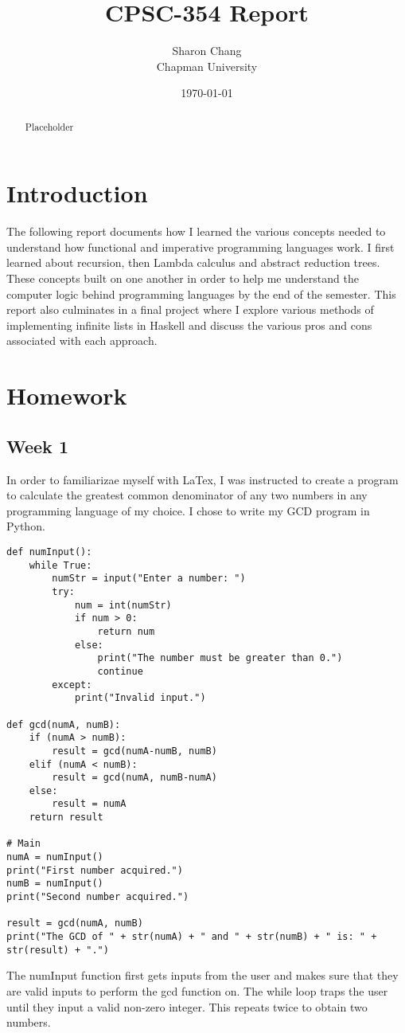 \documentclass{article}
\title{CPSC-354 Report}
\author{Sharon Chang  \\ Chapman University}
\date{\today}
\theoremstyle{theorem}
\theoremstyle{definition}
\theoremstyle{remark}
\begin{document}
\maketitle

\begin{abstract}
Placeholder  
\end{abstract}

\tableofcontents

\section{Introduction}\label{intro}

The following report documents how I learned the various concepts needed to understand how functional and imperative programming languages work. I first learned about recursion, then Lambda calculus and abstract reduction trees. These concepts built on one another in order to help me understand the computer logic behind programming languages by the end of the semester. This report also culminates in a final project where I explore various methods of implementing infinite lists in Haskell and discuss the various pros and cons associated with each approach.

\section{Homework}\label{homework}


\subsection{Week 1}

In order to familiarizae myself with LaTex, I was instructed to create a program to calculate the greatest common denominator of any two numbers in any programming language of my choice. I chose to write my GCD program in Python.

\begin{lstlisting}
def numInput():
    while True:
        numStr = input("Enter a number: ")
        try:
            num = int(numStr)
            if num > 0:
                return num
            else:
                print("The number must be greater than 0.")
                continue
        except:
            print("Invalid input.")

def gcd(numA, numB):
    if (numA > numB):
        result = gcd(numA-numB, numB)
    elif (numA < numB):
        result = gcd(numA, numB-numA)
    else:
        result = numA
    return result

# Main
numA = numInput()
print("First number acquired.")
numB = numInput()
print("Second number acquired.")

result = gcd(numA, numB)
print("The GCD of " + str(numA) + " and " + str(numB) + " is: " + str(result) + ".")
\end{lstlisting}
%
The numInput function first gets inputs from the user and makes sure that they are valid inputs to perform the gcd function on. The while loop traps the user until they input a valid non-zero integer. This repeats twice to obtain two numbers.
\end{document}
